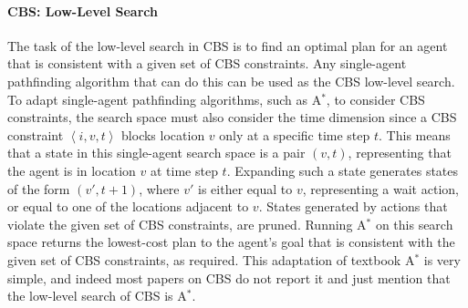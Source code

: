 \documentclass[review]{elsarticle}
\newcommand{\tuple}[1]{\ensuremath{\left \langle #1 \right \rangle }}
\newcommand\roni[1]{\nb{\textbf{Roni:}}{green}{#1}}
\newcommand\dor[1]{\nb{\textbf{Dor:}}{Fuchsia}{#1}}
\newcommand{\cbs}{\ac{CBS}\xspace}
\newcommand{\astar}{A$^*$\xspace}
\begin{document}




\paragraph{\textbf{\cbs: Low-Level Search}}
The task of the low-level search in \cbs is to find an optimal plan for an agent 
that is consistent with a given set of \cbs constraints. 
Any single-agent pathfinding algorithm that can do this can be used as the \cbs low-level search. 
To adapt single-agent pathfinding algorithms, such as \astar{}, to consider \cbs constraints, 
the search space must also consider the time dimension since a \cbs constraint $\tuple{i,v,t}$ 
blocks location $v$ only at a specific time step $t$. 
This means that a state in this single-agent search space is a pair $(v,t)$, representing that the agent is in location $v$ at time step $t$. Expanding such a state generates states 
of the form $(v',t+1)$, where $v'$ is either equal to $v$, representing a wait action, 
or equal to one of the locations adjacent to $v$. States generated by actions that violate the given set of \cbs constraints, are pruned. Running \astar{} on this search space returns the lowest-cost plan to the agent's goal that is consistent with the given set of \cbs constraints, as required. This adaptation of textbook \astar{} is very simple, and indeed most papers on \cbs do not report it and just mention that the low-level search of \cbs is \astar{}. 
\end{document}
